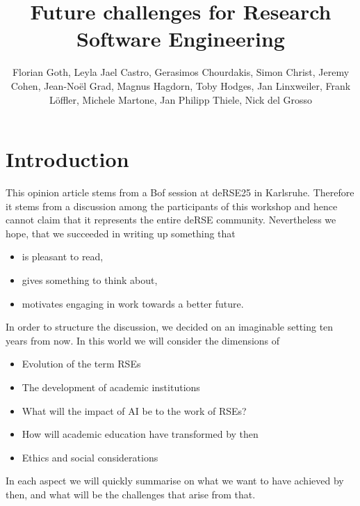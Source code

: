 \documentclass{eceasst}
\title{Future challenges for Research Software Engineering} %
\author{
Florian Goth\texorpdfstring{\autref{1}}{},
Leyla Jael Castro\texorpdfstring{\autref{1}}{},
Gerasimos Chourdakis\texorpdfstring{\autref{1}}{},
Simon Christ\texorpdfstring{\autref{1}}{},
Jeremy Cohen\texorpdfstring{\autref{1}}{},
Jean-Noël Grad\texorpdfstring{\autref{1}}{},
Magnus Hagdorn\texorpdfstring{\autref{1}}{},
Toby Hodges\texorpdfstring{\autref{1}}{},
Jan Linxweiler\texorpdfstring{\autref{1}}{},
Frank Löffler\texorpdfstring{\autref{1}}{},
Michele Martone\texorpdfstring{\autref{1}}{},
Jan Philipp Thiele\texorpdfstring{\autref{1}}{},
Nick del Grosso\texorpdfstring{\autref{1}}{}
} %
\institute{\autlabel{1} Fantasy University} %
\begin{document}
\maketitle

\section{Introduction}
This opinion article stems from a Bof session at deRSE25 in Karlsruhe\cite{Goth2025EndRSEng}.
Therefore it stems from a discussion among the participants of this workshop and hence cannot claim that it represents the entire deRSE community.
Nevertheless we hope, that we succeeded in writing up something that
\begin{itemize}
\item is pleasant to read,
\item gives something to think about,
\item motivates engaging in work towards a better future.
\end{itemize}
In order to structure the discussion, we decided on an imaginable setting ten years from now.
In this world we will consider the dimensions of 
\begin{itemize}
\item Evolution of the term RSEs
\item The development of academic institutions
\item What will the impact of AI be to the work of RSEs?
\item How will academic education have transformed by then
\item Ethics and social considerations
\end{itemize}
In each aspect we will quickly summarise on what we want to have achieved by then, and what will be the challenges that arise from that.
\end{document}
